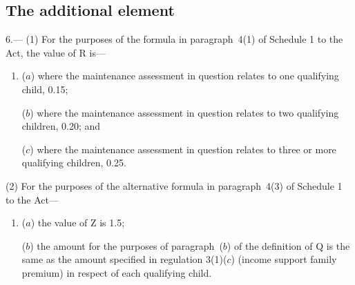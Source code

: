\documentclass[12pt,a4paper]{article}
\begin{document}
\subsection[6. The additional element]{The additional element}

6.—%
(1) For the purposes of the formula in paragraph~4(1) of Schedule 1 to the Act, the value of R is—
\begin{enumerate}\item[]
($a$) where the maintenance assessment in question relates to one qualifying child, 0.15;

($b$) where the maintenance assessment in question relates to two qualifying children, 0.20; and

($c$) where the maintenance assessment in question relates to three or more qualifying children, 0.25.
\end{enumerate}%

(2) For the purposes of the alternative formula in paragraph~4(3) of Schedule 1 to the Act—
\begin{enumerate}\item[]
($a$) the value of Z is 
1.5;  %

($b$) the amount for the purposes of paragraph~($b$) of the definition of Q is the same as the amount specified in 
regulation 
  3(1)($c$)  %
(income support family premium) in respect of each qualifying child.
\end{enumerate}

\end{document}
